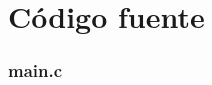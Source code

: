 \documentclass[10pt,a4paper]{article}
\begin{document}
\appendix
\section{Código fuente}\label{appendix_codigo_fuente}

\subsubsection{main.c}\label{main}


\newpage

\end{document}
